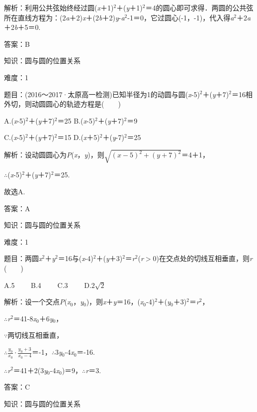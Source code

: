 \documentclass{article} %
\begin{document}
解析：利用公共弦始终经过圆(\textit{x}＋1)${}^{2}$＋(\textit{y}＋1)${}^{2}$＝4的圆心即可求得．两圆的公共弦所在直线方程为：(2\textit{a}＋2)\textit{x}＋(2\textit{b}＋2)\textit{y}-\textit{a}${}^{2}$-1＝0，它过圆心(-1，-1)，代入得\textit{a}${}^{2}$＋2\textit{a}＋2\textit{b}＋5＝0.

答案：B

知识：圆与圆的位置关系

难度：1

题目：(2016～2017·太原高一检测)已知半径为1的动圆与圆(\textit{x}-5)${}^{2}$＋(\textit{y}＋7)${}^{2}$＝16相外切，则动圆圆心的轨迹方程是(　　)

A.(\textit{x}-5)${}^{2}$＋(\textit{y}＋7)${}^{2}$＝25 B.(\textit{x}-5)${}^{2}$＋(\textit{y}＋7)${}^{2}$＝9

C.(\textit{x}-5)${}^{2}$＋(\textit{y}＋7)${}^{2}$＝15 D.(\textit{x}＋5)${}^{2}$＋(\textit{y}-7)${}^{2}$＝25

解析：设动圆圆心为\textit{P}(\textit{x}，\textit{y})，则$\sqrt{(x-5)^2+(y+7)^2}$＝4＋1，

$\mathrm{\therefore}$(\textit{x}-5)${}^{2}$＋(\textit{y}＋7)${}^{2}$＝25.

故选A.

答案：A

知识：圆与圆的位置关系

难度：1

题目：两圆\textit{x}${}^{2}$＋\textit{y}${}^{2}$＝16与(\textit{x}-4)${}^{2}$＋(\textit{y}＋3)${}^{2}$＝\textit{r}${}^{2}$(\textit{r}$\mathrm{>}$0)在交点处的切线互相垂直，则\textit{r}
(　　)

A.5　　 B.4　　 C.3　　 D.$2\sqrt{2}$

解析：设一个交点\textit{P}(\textit{x}${}_{0}$，\textit{y}${}_{0}$)，则\textit{x}＋\textit{y}＝16，(\textit{x}${}_{0}$-4)${}^{2}$＋(\textit{y}${}_{0}$＋3)${}^{2}$＝\textit{r}${}^{2}$，

$\mathrm{\therefore}$\textit{r}${}^{2}$＝41-8\textit{x}${}_{0}$＋6\textit{y}${}_{0}$，

$\mathrm{\because}$两切线互相垂直，

$\mathrm{\therefore}$$\frac{y_0}{x_0}\cdot\frac{y_0+3}{x_0-4}$＝-1，$\mathrm{\therefore}$3\textit{y}${}_{0}$-4\textit{x}${}_{0}$＝-16.

$\mathrm{\therefore}$\textit{r}${}^{2}$＝41＋2(3\textit{y}${}_{0}$-4\textit{x}${}_{0}$)＝9，$\mathrm{\therefore}$\textit{r}＝3.

答案：C

知识：圆与圆的位置关系
\end{document}
